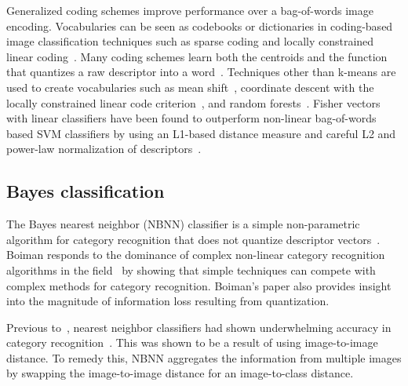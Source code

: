         Generalized coding schemes improve performance over a bag-of-words image encoding. Vocabularies can be seen
        as codebooks or dictionaries in coding-based image classification techniques such as sparse coding and
        locally constrained linear coding~\cite{jurie_creating_2005, yang_linear_2009, yang_supervised_2010,
        yang_efficient_2010, wang_locality_constrained_2010}. Many coding schemes learn both the centroids 
        and the function that quantizes a raw descriptor into a word~\cite{jurie_creating_2005, yang_linear_2009,
        yang_supervised_2010, yang_efficient_2010, wang_locality_constrained_2010, vedaldi_multiple_2009}.
        Techniques other than k-means are used to create vocabularies such as mean
        shift~\cite{jurie_creating_2005}, coordinate descent with the locally constrained linear code
        criterion~\cite{wang_locality_constrained_2010}, and random forests~\cite{perronnin_fisher_2007}. Fisher
        vectors with linear classifiers have been found to outperform non-linear bag-of-words based SVM classifiers
        by using an L1-based distance measure and careful L2 and power-law normalization of
        descriptors~\cite{perronnin_improving_2010, perronnin_large_scale_2010}.

    \subsection{\Naive{} Bayes classification}\label{sec:nbnn}  

        The \naive{} Bayes nearest neighbor (NBNN) classifier is a simple non-parametric algorithm for category
        recognition that does not quantize descriptor vectors~\cite{boiman_defense_2008}. Boiman responds to the
        dominance of complex non-linear category recognition algorithms in the field~\cite{varma_learning_2007,
        marszalek_learning_2007} by showing that simple techniques can compete with complex methods for category
        recognition. Boiman's paper also provides insight into the magnitude of information loss resulting from
        quantization.
          
        Previous to~\cite{boiman_defense_2008}, nearest neighbor classifiers had shown underwhelming accuracy in
        category recognition~\cite{varma_unifying_2004, lazebnik_beyond_2006, marszalek_learning_2007}. This was
        shown to be a result of using image-to-image distance. To remedy this, NBNN aggregates the information from
        multiple images by swapping the image-to-image distance for an image-to-class distance.

